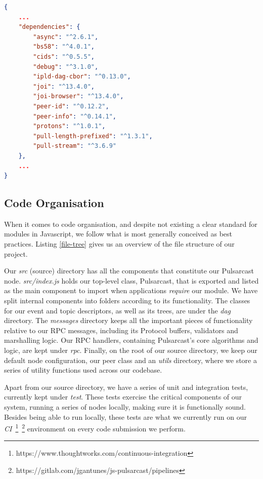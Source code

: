 \begin{lstlisting}[language=JSON, float, caption={Pulsarcast module dependency list},label={dependencies}]
{
	...
	"dependencies": {
		"async": "^2.6.1",
		"bs58": "^4.0.1",
		"cids": "^0.5.5",
		"debug": "^3.1.0",
		"ipld-dag-cbor": "^0.13.0",
		"joi": "^13.4.0",
		"joi-browser": "^13.4.0",
		"peer-id": "^0.12.2",
		"peer-info": "^0.14.1",
		"protons": "^1.0.1",
		"pull-length-prefixed": "^1.3.1",
		"pull-stream": "^3.6.9"
	},
	...
}
\end{lstlisting}

\subsection{Code Organisation}\label{subsec:code-organisation}

When it comes to code organisation, and despite not existing a clear standard
for modules in Javascript, we follow what is most generally conceived as best
practices. Listing \ref{file-tree} gives us an overview of the file structure
of our project. 

Our \emph{src} (source) directory has all the components that constitute our
Pulsarcast node. \emph{src/index.js} holds our top-level class, Pulsarcast,
that is exported and listed as the main component to import when applications
\emph{require} our module. We have split internal components into folders
according to its functionality. The classes for our event and topic
descriptors, as well as its trees, are under the \emph{dag} directory. The
\emph{messages} directory keeps all the important pieces of functionality
relative to our RPC messages, including its Protocol buffers, validators and
marshalling logic. Our RPC handlers, containing Pulsarcast's core algorithms
and logic, are kept under \emph{rpc}. Finally, on the root of our source
directory, we keep our default node configuration, our peer class and an
\emph{utils} directory, where we store a series of utility functions used
across our codebase.

Apart from our source directory, we have a series of unit and integration
tests, currently kept under \emph{test}. These tests exercise the critical
components of our system, running a series of nodes locally, making sure it is
functionally sound. Besides being able to run locally, these tests are what we
currently run on our
\emph{CI}~\footnote{https://www.thoughtworks.com/continuous-integration}~\footnote{https://gitlab.com/jgantunes/js-pulsarcast/pipelines}
environment on every code submission we perform.

